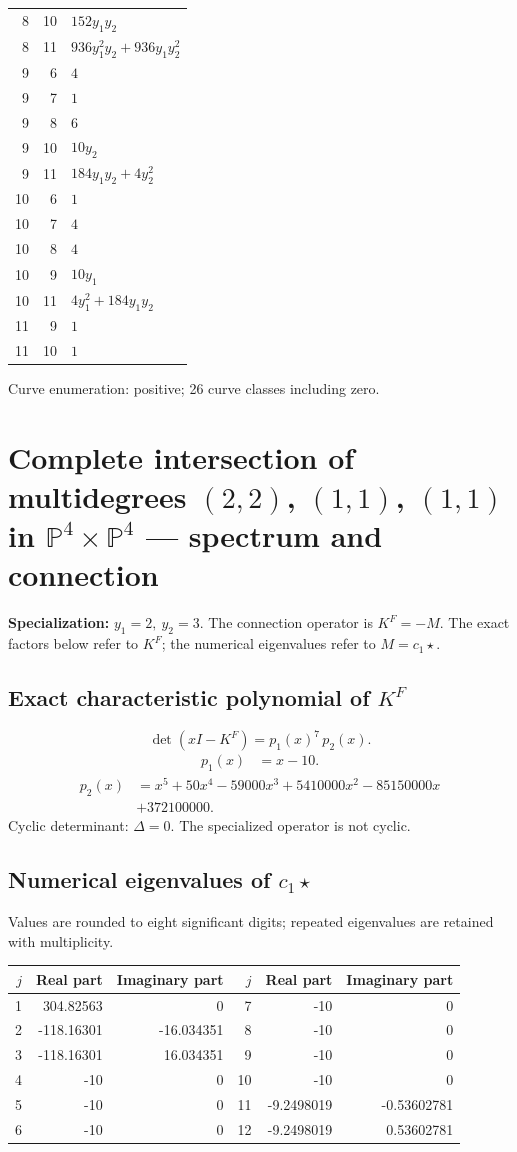 \documentclass[10pt,a4paper]{article}
\begin{document}
{\begin{longtable}{rrp{125mm}}
8 & 10 & $152 y_{1} y_{2}$\\
8 & 11 & $936 y_{1}^{2} y_{2} + 936 y_{1} y_{2}^{2}$\\
9 & 6 & $4$\\
9 & 7 & $1$\\
9 & 8 & $6$\\
9 & 10 & $10 y_{2}$\\
9 & 11 & $184 y_{1} y_{2} + 4 y_{2}^{2}$\\
10 & 6 & $1$\\
10 & 7 & $4$\\
10 & 8 & $4$\\
10 & 9 & $10 y_{1}$\\
10 & 11 & $4 y_{1}^{2} + 184 y_{1} y_{2}$\\
11 & 9 & $1$\\
11 & 10 & $1$\\
\end{longtable}}
Curve enumeration: positive; 26 curve classes including zero.
\clearpage\section*{Complete intersection of multidegrees $(2,2)$, $(1,1)$, $(1,1)$ in $\mathbb P^{4}\times \mathbb P^{4}$ --- spectrum and connection}
\textbf{Specialization:} $y_1=2,\ y_2=3$. The connection operator is $K^F=-M$. The exact factors below refer to $K^F$; the numerical eigenvalues refer to $M=c_1\star$.
\subsection*{Exact characteristic polynomial of $K^F$}
\[\det(xI-K^F)=p_{1}(x)^{7}\,p_{2}(x).\]
\[\begin{aligned}p_{1}(x)&=x - 10.\end{aligned}\]
\[\begin{aligned}p_{2}(x)&=x^{5} + 50 x^{4} - 59000 x^{3} + 5410000 x^{2} - 85150000 x\\&+372100000.\end{aligned}\]
Cyclic determinant: $\Delta=0$. The specialized operator is not cyclic.
\subsection*{Numerical eigenvalues of $c_1\star$}
Values are rounded to eight significant digits; repeated eigenvalues are retained with multiplicity.
\begin{center}\small\begin{tabular}{rrr@{\qquad}rrr}\toprule $j$ & Real part & Imaginary part & $j$ & Real part & Imaginary part\\\midrule
1 & 304.82563 & 0 & 7 & -10 & 0\\
2 & -118.16301 & -16.034351 & 8 & -10 & 0\\
3 & -118.16301 & 16.034351 & 9 & -10 & 0\\
4 & -10 & 0 & 10 & -10 & 0\\
5 & -10 & 0 & 11 & -9.2498019 & -0.53602781\\
6 & -10 & 0 & 12 & -9.2498019 & 0.53602781\\
\bottomrule\end{tabular}\end{center}
\end{document}
